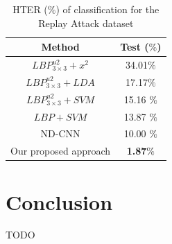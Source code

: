 \documentclass[journal]{IEEEtran}
\begin{document}
 \begin{table}[ht]
 	\renewcommand{\arraystretch}{1.3}
 	\normalsize
 	\centering
 	\caption{ HTER ($\%$) of classification for the Replay Attack dataset}
 	\label{tab_EX_2}
 	\begin{tabular}{|c|c|}
 		\hline
 		Method & Test ($\%$)\\
 		\hline \hline
 		$LBP^{u2}_{3 \times3}+x^{2}$ & 34.01$\%$ \\
 		\hline
 		$LBP^{u2}_{3 \times3}+LDA$ & 17.17$\%$ \\
 		\hline 
 		$LBP^{u2}_{3 \times3}+SVM$ & 15.16 $\%$  \\
 		\hline
 		$LBP+SVM$ & 13.87 $\%$ \\
 		\hline
 		ND-CNN  & 10.00 $\%$ \\
 		\hline
 		Our proposed approach  & \textbf{1.87$\%$} \\
 		\hline
 	\end{tabular}
 \end{table}


\section{Conclusion}

TODO






%
\end{document}
